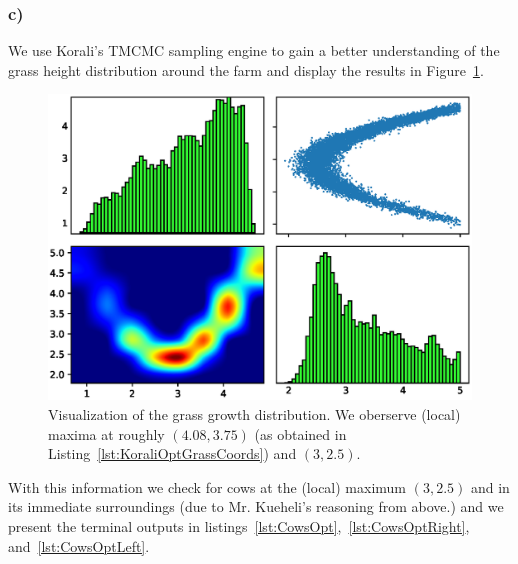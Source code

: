 \documentclass{article}
\begin{document}
    \subsubsection*{c)}
    \label{subsubsec:Task1c}

    We use Korali's TMCMC sampling engine to gain a better understanding of
    the grass height distribution around the farm and display the results
    in Figure~\ref{fig:GrassHeight}.

    \begin{figure}[H]
         \begin{center}
            \includegraphics[width=.75\textwidth]{task1/results/task1c.eps}
        \end{center}
        \caption{Visualization of the grass growth distribution.
        We oberserve (local) maxima at roughly $\left( 4.08, 3 .75 \right)$
        (as obtained in Listing~\ref{lst:KoraliOptGrassCoords}) and
        $\left( 3, 2.5 \right)$.}
        \label{fig:GrassHeight}
    \end{figure}

    With this information we check for cows at the (local) maximum
    $\left( 3, 2.5 \right)$ and in its immediate surroundings (due to Mr.
    Kueheli's reasoning from above.) and we present the terminal outputs in
    listings~\ref{lst:CowsOpt},~\ref{lst:CowsOptRight},
    and~\ref{lst:CowsOptLeft}.
\end{document}
